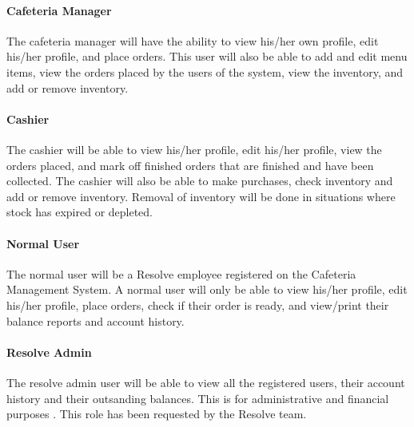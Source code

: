 \documentclass[a4paper,12pt]{article}
\begin{document}
\paragraph{ Cafeteria Manager\\}
The cafeteria manager will have the ability to view his/her own profile, edit his/her profile, and place orders. This user will also be able to add and edit menu items, view the orders placed by the users of the system, view the inventory, and add or remove inventory. 

\paragraph{ Cashier\\}
The cashier will be able to view his/her profile, edit his/her profile, view the orders placed, and mark off finished orders that are finished and have been collected. The cashier will also be able to make purchases, check inventory and add or remove inventory. Removal of inventory will be done in situations where stock has expired or depleted.

\paragraph{ Normal User\\}
The normal user will be a Resolve employee registered on the Cafeteria Management System.  A normal user will only be able to view his/her profile, edit his/her profile, place orders, check if their order is ready, and view/print their balance reports and account history.

\paragraph{ Resolve Admin\\}
The resolve admin user will be able to view all the registered users, their account history and their outsanding balances. This is for administrative and financial purposes . This role has been requested by the Resolve team.

\end{document}
